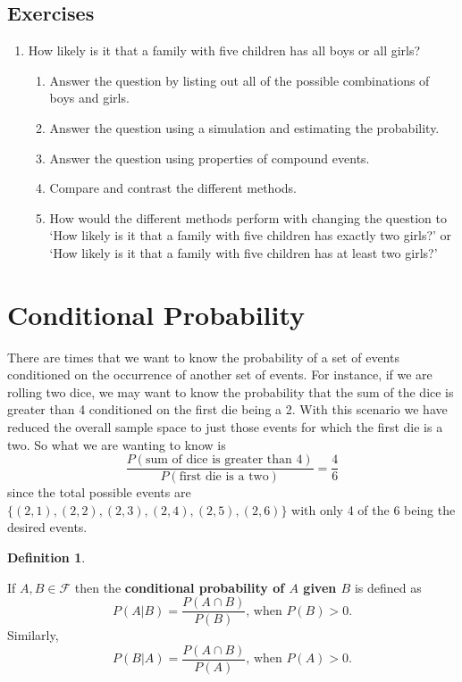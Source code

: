 \documentclass[
]{book}
\providecommand{\tightlist}{%
  \setlength{\itemsep}{0pt}\setlength{\parskip}{0pt}}
\theoremstyle{definition}
\newtheorem{definition}{Definition}[chapter]
\theoremstyle{definition}
\theoremstyle{definition}
\theoremstyle{definition}
\theoremstyle{remark}
\begin{document}
\hypertarget{exercises-66}{%
\subsection{Exercises}\label{exercises-66}}

\begin{enumerate}
\def\labelenumi{\arabic{enumi}.}
\item
  How likely is it that a family with five children has all boys or all girls?

  \begin{enumerate}
  \def\labelenumii{\alph{enumii}.}
  \tightlist
  \item
    Answer the question by listing out all of the possible combinations of boys and girls.
  \item
    Answer the question using a simulation and estimating the probability.
  \item
    Answer the question using properties of compound events.
  \item
    Compare and contrast the different methods.
  \item
    How would the different methods perform with changing the question to `How likely is it that a family with five children has exactly two girls?' or `How likely is it that a family with five children has at least two girls?'
  \end{enumerate}
\end{enumerate}

\hypertarget{conditional-probability}{%
\section{Conditional Probability}\label{conditional-probability}}

There are times that we want to know the probability of a set of events conditioned on the occurrence of another set of events. For instance, if we are rolling two dice, we may want to know the probability that the sum of the dice is greater than 4 conditioned on the first die being a 2. With this scenario we have reduced the overall sample space to just those events for which the first die is a two. So what we are wanting to know is
\[\frac{P(\mbox{sum of dice is greater than 4})}{P(\mbox{first die is a two})} = \frac{4}{6}\] since the total possible events are \(\{(2,1), (2,2), (2,3), (2,4), (2,5), (2,6)\}\) with only 4 of the 6 being the desired events.

\begin{definition}
\protect\hypertarget{def:unlabeled-div-310}{}\label{def:unlabeled-div-310}

If \(A,B\in \mathcal{F}\) then the \textbf{conditional probability of \(A\) given \(B\)} is defined as
\[P(A\vert B) = \frac{P(A\cap B)}{P(B)} \mbox{, when } P(B)>0.\]
Similarly,
\[P(B\vert A) = \frac{P(A\cap B)}{P(A)} \mbox{, when } P(A)>0.\]

\end{definition}
\end{document}
